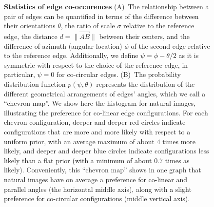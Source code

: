 \documentclass[a4paper, 11pt]{book}
\begin{document}
\begin{figure}
{
}
\vspace*{-1.cm}
\caption{{\bf Statistics of edge co-occurences}
 \textsf{(A)}~The relationship between a pair of edges can be quantified
in terms of the difference between their orientations $\theta$,
the ratio of scale $\sigma$ relative to the reference edge,
the distance $d=\|\vec{AB}\|$ between their centers,
and the difference of azimuth (angular location) $\phi$
of the second edge relative to the reference edge.
Additionally, we define $\psi=\phi - \theta/2$ as it is
symmetric with respect to the choice of the reference edge,
in particular, $\psi=0$ for co-circular edges.
\textsf{(B)}~The probability distribution function $p(\psi, \theta)$
represents the distribution of the different geometrical arrangements of edges' angles,
which we call a ``chevron map''.
We show here the histogram for natural images,
illustrating the preference for co-linear edge configurations.
For each chevron configuration, deeper and deeper red circles
indicate configurations that are more and more likely
with respect to a uniform prior, %
with an average maximum of about $4$ times more likely,
and deeper and deeper blue circles indicate configurations less likely
than a flat prior (with a minimum of about $0.7$ times as likely).
Conveniently, this ``chevron map'' shows in one graph that natural images
have on average a preference for co-linear and parallel angles
(the horizontal middle axis), %
along with a slight preference for co-circular configurations (middle vertical axis).
\label{fig:secondorder}}%
\end{figure}%
\end{document}
